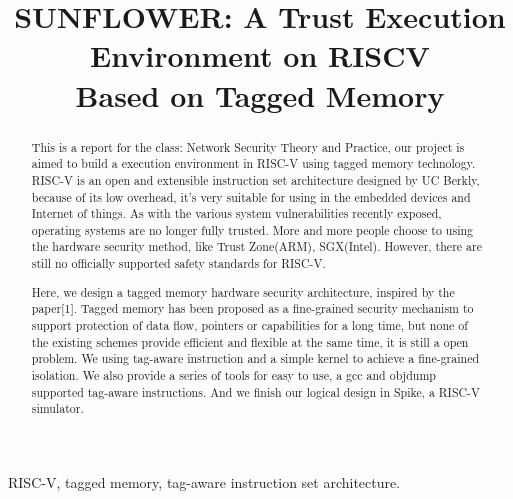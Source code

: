 \documentclass[conference]{IEEEtran}
\begin{document}
\title{\LARGE SUNFLOWER: A Trust Execution Environment on RISCV \\Based on Tagged Memory}
\author{ }

\maketitle
\setlength{\parskip}{0.4\baselineskip}


\begin{abstract}
This is a report for the class: Network Security Theory and Practice, our project is aimed to build a execution environment in RISC-V using tagged memory technology. RISC-V is an open and extensible instruction set architecture designed by UC Berkly, because of its low overhead, it's very suitable for using in the embedded devices and Internet of things. As with the various system vulnerabilities recently exposed, operating systems are no longer fully trusted. More and more people choose to using the hardware security method, like Trust Zone(ARM), SGX(Intel). However, there are still no officially supported safety standards for RISC-V.

Here, we design a tagged memory hardware security architecture, inspired by the paper[1]. Tagged memory has been proposed as a fine-grained security mechanism to support protection of data flow, pointers or capabilities for a long time, but none of the existing schemes provide efficient and flexible at the same time, it is still a open problem. We using tag-aware instruction and a simple kernel to achieve a fine-grained isolation. We also provide a series of tools for easy to use, a gcc and objdump supported tag-aware instructions. And we finish our logical design in Spike, a RISC-V simulator.
\end{abstract}

\begin{keywords}
RISC-V, tagged memory, tag-aware instruction set architecture.\\
\end{keywords}

\end{document}
